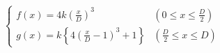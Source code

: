 \documentclass[
  11pt,
  border=2,
  convert={
    density=150 -alpha off,
    outext=.png
  },
]{standalone}
\begin{document}
$
  \begin{cases}
    \displaystyle f(x) = 4k(\frac{x}{D})^{3} & (0 \leq x \leq \frac{D}{2})
    \\
    \displaystyle g(x) = k\left\{4(\frac{x}{D} - 1)^{3} + 1\right\} & (\frac{D}{2} \leq x \leq D)
  \end{cases}
$
\end{document}
